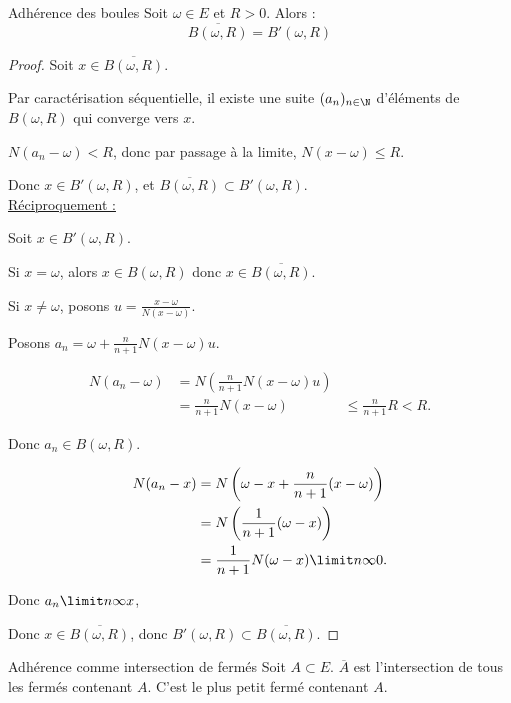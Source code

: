 \begin{proposition}{Adhérence des boules}{}
    Soit $\omega \in E$ et $R > 0$. Alors :
     $$\overline{B(\omega, R)} = B'(\omega, R)$$
\end{proposition}

\begin{proof}
    Soit $x \in \overline{B(\omega, R)}$.

    Par caractérisation séquentielle, il existe une suite $(a_n)_{n \in \N}$ d'éléments de
    $B(\omega, R)$ qui converge vers $x$.

    $N(a_n - \omega) < R$, donc par passage à la limite, $N(x - \omega) \leqslant R$. 

    Donc $x \in B'(\omega, R)$, et $\overline{B(\omega, R)} \subset B'(\omega, R)$. \\

    \uline{Réciproquement : }

    \svspace Soit $x \in B'(\omega, R)$.

    Si $x = \omega$, alors $x \in B(\omega, R)$ donc $x \in \overline{B(\omega, R)}$.

    Si $x \neq \omega$, posons $u = \frac{x - \omega }{N(x - \omega)}$.

    Posons $a_n = \omega + \frac n {n + 1} N(x - \omega)u$. 

    \begin{align*}
        N(a_n - \omega) & = N\left( \frac n {n + 1} N(x - \omega) u \right) \\
        & = \frac n {n + 1} N(x - \omega) 
        & \leqslant \frac n {n + 1} R < R.  
    \end{align*}

    Donc $a_n \in B(\omega, R)$.

    \begin{align*}
        N(a_n - x) & = N\left( \omega - x + \frac n {n + 1} (x - \omega) \right) \\
        & = N\left( \frac 1 {n + 1}(\omega - x) \right) \\
        & = \frac 1 {n + 1} N(\omega - x) \limit n \infty 0.
    \end{align*}

    Donc $a_n \limit n \infty x$, 

    Donc $x \in \overline{B(\omega, R)}$, donc $B'(\omega, R) \subset \overline{B(\omega, R)}$.
\end{proof}

\begin{theoreme}{Adhérence comme intersection de fermés}{}
    Soit $A \subset E$.
    $\overline{A}$ est l'intersection de tous les fermés contenant $A$.
    C'est le plus petit fermé contenant $A$.
\end{theoreme}

